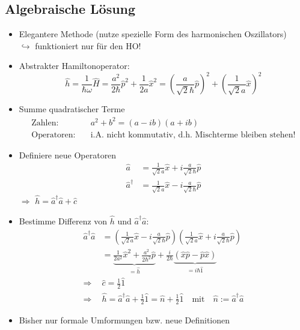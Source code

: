 \documentclass[10pt,article,colorback,accentcolor=tud9d]{scrartcl}
\begin{document}
\subsection{Algebraische Lösung}
\begin{itemize}
  \item Elegantere Methode (nutze spezielle Form des harmonischen Oszillators)\\
    $\hookrightarrow$ funktioniert nur für den HO!
  \item Abstrakter Hamiltonoperator:
    \begin{equation}
    \hat{h}=\frac{1}{\hbar\omega}\hat{H}=\frac{a^2}{2\hbar}\hat{p}^2+\frac{1}{2a}\hat{x}^2=\left(\frac{a}{\sqrt{2}\hbar}\hat{p}\right)^2+\left(\frac{1}{\sqrt{2}a}\hat{x}\right)^2
    \end{equation}
  \item Summe quadratischer Terme
    \begin{align}
    \text{Zahlen:}\quad &a^2+b^2=(a-ib)(a+ib)\\
    \text{Operatoren:}\quad &\text{i.A. nicht kommutativ, d.h. Mischterme bleiben stehen!}
    \end{align}
  \item Definiere neue Operatoren
    \begin{align}
    \hat{a}&=\frac{1}{\sqrt{2}a}\hat{x}+i\frac{a}{\sqrt{2}\hbar}\hat{p}\\
    \hat{a}^\dagger&=\frac{1}{\sqrt{2}a}\hat{x}-i\frac{a}{\sqrt{2}\hbar}\hat{p}
    \end{align}
    $\Rightarrow$ $\hat{h}=\hat{a}^\dagger\hat{a}+\hat{c}$
  \item Bestimme Differenz von $\hat{h}$ und $\hat{a}^\dagger\hat{a}$:
    \begin{align}
    \hat{a}^\dagger\hat{a}&=\left(\frac{1}{\sqrt{2}a}\hat{x}-i\frac{a}{\sqrt{2}\hbar}\hat{p}\right)\left(\frac{1}{\sqrt{2}a}\hat{x}+i\frac{a}{\sqrt{2}\hbar}\hat{p}\right)\\
    &=\underbrace{\frac{1}{2a^2}\hat{x}^2+\frac{a^2}{2\hbar^2}\hat{p}}_{=\hat{h}}+\frac{i}{2\hbar}\underbrace{(\hat{x}\hat{p}-\hat{p}\hat{x})}_{=i\hbar\hat{1}}\\
    \Rightarrow &\hat{c}=\frac{1}{2}\hat{1}\\
    \Rightarrow &\hat{h}=\hat{a}^\dagger\hat{a}+\frac{1}{2}\hat{1}=\hat{n}+\frac{1}{2}\hat{1} \quad \text{mit}\quad \hat{n}:=\hat{a}^\dagger\hat{a}
    \end{align}
  \item Bisher nur formale Umformungen bzw. neue Definitionen\\

\end{itemize}
\end{document}

